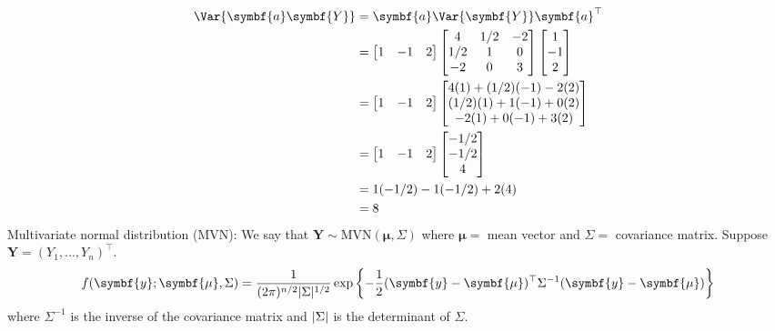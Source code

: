 \begin{align*}
    \Var{\symbf{a}\symbf{Y}}
     & = \symbf{a}\Var{\symbf{Y}}\symbf{a}^\top \\
     & =
    \begin{bmatrix}
        1 & -1 & 2
    \end{bmatrix}
    \begin{bmatrix}
        4   & 1/2 & -2 \\
        1/2 & 1   & 0  \\
        -2  & 0   & 3
    \end{bmatrix}
    \begin{bmatrix}
        1  \\
        -1 \\
        2
    \end{bmatrix}                  \\
     & =
    \begin{bmatrix}
        1 & -1 & 2
    \end{bmatrix}
    \begin{bmatrix}
        4(1)+(1/2)(-1)-2(2) \\
        (1/2)(1)+1(-1)+0(2) \\
        -2(1)+0(-1)+3(2)
    \end{bmatrix}                  \\
     & =\begin{bmatrix}
        1 & -1 & 2
    \end{bmatrix}
    \begin{bmatrix}
        -1/2 \\
        -1/2 \\
        4
    \end{bmatrix}                  \\
     & =1(-1/2)-1(-1/2)+2(4)                    \\
     & =8
\end{align*}
Multivariate normal distribution (MVN):
We say that $ \symbf{Y} \sim \text{MVN}(\symbf{\mu},\Sigma) $
where $ \symbf{\mu}= $ mean vector and $ \Sigma= $
covariance matrix. Suppose $ \symbf{Y}=(Y_1,\ldots,Y_n)^\top $.
\[ f(\symbf{y};\symbf{\mu},\Sigma)=
    \frac{1}{(2\pi)^{n/2}\abs{\Sigma}^{1/2}}
    \exp\left\{ -\frac{1}{2}(\symbf{y}-\symbf{\mu})^\top
    \Sigma^{-1}(\symbf{y}-\symbf{\mu}) \right\}  \]
where $ \Sigma^{-1} $ is the inverse of the covariance matrix
and $ \lvert\Sigma\rvert $ is the determinant of $ \Sigma $.

